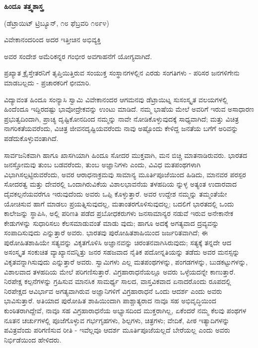 \begin{center}
\textbf{ಹಿಂದೂ ತತ್ತ್ವಶಾಸ್ತ್ರ}
\end{center}

\begin{center}
(ಡೆಟ್ರಾಯಿಟ್ ಟ್ರಿಬ್ಯೂನ್, ೧೮ ಫೆಬ್ರವರಿ ೧೮೯೪)
\end{center}

\begin{center}
ವಿವೇಕಾನಂದರಿಂದ ಅದರ ಇತ್ತೀಚಿನ ಅಭಿವ್ಯಕ್ತಿ
\end{center}

\begin{center}
ಅವರ ಸಂದೇಶ ಅಮೆರಿಕನ್ನರ ಗಂಭೀರ ಅವಗಾಹನೆಗೆ ಯೋಗ್ಯವಾಗಿದೆ.
\end{center}

ಪ್ರಖ್ಯಾತ ಕ್ರೈಸ್ತೇತರನಿಗೆ ತೃಪ್ತಿಯಿತ್ತಿರುವ ಸಂಯುಕ್ತ ಸಂಸ್ಥಾನಗಳಲ್ಲಿನ ಎರಡು ಸಂಗತಿಗಳು - ಪರಿಸರ ಜನಗಳಿಗೇನು ಮಾಡಬಲ್ಲದು - ಪ್ರಚಾರಕರಿಗೆ ಛೀಮಾರಿ.

ವಿದ್ಯಾವಂತ ಹಿಂದೂ ಸಂನ್ಯಾಸಿ ಸ್ವಾಮಿ ವಿವೇಕಾನಂದರ ಆಗಮನವು ಡೆಟ್ರಾಯಿಟ್ನ ಸುಸಂಸ್ಕೃತ ವಲಯಗಳಲ್ಲಿ ಹಿಂದೆಂದೂ ಇದ್ದಿರದಷ್ಟು ಭಾವೋದ್ರೇಕವನ್ನು ಉಂಟು ಮಾಡಿದೆ. ನಮ್ಮ ಭಾಷೆಯ ಮೇಲೆ ಅವರಿಗೆ ಇರುವ ಅಸಾಧಾರಣ ಪ್ರಭುತ್ವದಿಂದಾಗಿ, ಪ್ರಾಚ್ಯ ದೃಷ್ಟಿಕೋನದಿಂದ ನಮ್ಮನ್ನು ನಾವೇ ನೋಡಿಕೊಳ್ಳುವುದಕ್ಕೆ ಸಾಧ್ಯವಾಗಿದೆ; ಮತ್ತು ವಿಚಿತ್ರ ನಾಗರಿಕತೆಯವರೆಂದು, ವಿಚಿತ್ರ ಜೀವನದೃಷ್ಟಿಯವರೆಂದು ನಾವು ಅಷ್ಟೊಂದು ಕೇಳಿದ್ದ ಜನತೆಯ ಬಗೆಗೆ ಅರಿವನ್ನು ಪಡೆದುಕೊಳ್ಳುವಂತಾಗಿದೆ.

ಸಾರ್ವಜನಿಕವಾಗಿ ಹಾಗೂ ಖಾಸಗಿಯಾಗಿ ಹಿಂದೂ ಸೋದರ ಮುಕ್ತವಾಗಿ, ಮನ ಬಿಚ್ಚಿ ಮಾತನಾಡಿರುವರು. ಭಾರತದ ಜನಸ್ತೋಮವು ತುಂಬ ಬಡವರೆಂದು, ತುಂಬ ಅಜ್ಞಾನಿಗಳು ಎಂದು, ವಿವಿಧ ಮತಪಂಥಗಳಾಗಿ ವಿಭಾಗಿಸಲ್ಪಟ್ಟಿರುವರೆಂದು, ಅವರ ಆರಾಧನಾಕ್ರಮವು ಸಾಮಾನ್ಯ ಮೂರ್ತಿಪೂಜೆಯಿಂದ ಹಿಡಿದು, ಮಾನವರ ಪರಸ್ಪರ ಸೋದರತ್ವ ಮತ್ತು ದೇವರಲ್ಲಿ ಒಂದಾಗಿರುವಿಕೆಯ ವಿಶಾಲಭಾವನೆಯ ತಳಹದಿಯ ನ್ನುಳ್ಳ ಅತ್ಯಂತ ಉದಾರವಾದ ದೈವಕಲ್ಪನೆಯವರೆಗೂ ಇರುವುದೆಂದು ಅವರು ಒಪ್ಪಿ ಕೊಳ್ಳುತ್ತಾರೆ. ಅವರ ಉದ್ದೇಶ ನಮ್ಮನ್ನು ತಮ್ಮಂತೆಯೇ ಯೋಚಿಸುವ ಹಾಗೆ ಮಾಡಲು ಪ್ರಯತ್ನಿಸುವುದಲ್ಲ, ಮತಾಂತರಗೊಳಿಸುವುದಲ್ಲ; ಬದಲಿಗೆ ಭಾರತದಲ್ಲಿ ಒಂದು ಕಾಲೇಜನ್ನು ಸ್ಥಾಪಿಸಿ, ಅಲ್ಲಿ ಪರಿಣತಿ ಪಡೆದ ಪ್ರಬೋಧಕರುಗಳು ಜನಸಾಮಾನ್ಯರ ನಡುವೆ ಇರುವ ಅನೇಕಾನೇಕ ಕೇಡುಗಳನ್ನು ಸುಧಾರಿಸಲು ಕೆಲಸಮಾಡುವಂತೆ ಮಾಡು ವುದು; ಹಾಗೂ ಅದಕ್ಕೆ ಅಗತ್ಯವಾದ ದ್ರವ್ಯವನ್ನು ಸಂಪಾದಿಸುವುದು ಎನ್ನುತ್ತಾರೆ ಅವರು. ಭಾರತವು ಪುರೋಹಿತಶಾಹಿಯಿಂದ ಜರ್ಜರಿತವಾಗಿದೆ; ಈ ಪುರೋಹಿತಶಾಹಿಯೇ ಸತ್ಯವನ್ನು ವಿಕೃತಗೊಳಿಸಿ ಅಜ್ಞಾನವನ್ನು ಚಿರಂತನವಾಗಿಸಿರುವುದು; ಸತ್ಯಕ್ಕೆ ತನ್ನದೇ ಆದ ಅಸಂಸ್ಕೃತ ಸಂಕುಚಿತ ವ್ಯಾಖ್ಯಾನವನ್ನಿತ್ತು ಜನರ ಸಹಜವಾದ ನೈತಿಕ ಪದೋನ್ನತಿಯನ್ನು ತಡೆದು ಅವರ ಮನಸ್ಸನ್ನು ವಿಕೃತವನ್ನಾಗಿಸುವುದು ಎನ್ನುತ್ತಾರೆ ಅವರು. ಸ್ವಾಮಿಗಳು ಎಲ್ಲ ಮತಪಂಥಗಳನ್ನು, ಪಂಗಡಗಳನ್ನು, ಬುಡಕಟ್ಟುಗಳನ್ನು, ವಿಶಾಲವಾದ ತಳಹದಿಯ ಮೇಲೆ ಪರಿಗಣಿಸುತ್ತಾರೆ. ವಿಗ್ರಹಾರಾಧನೆಯಲ್ಲೂ ಅವರು ಒಳ್ಳೆಯದನ್ನೇ ಕಾಣುತ್ತಾರೆ. ನಿರಪೇಕ್ಷ ಕಲ್ಪನೆಗಳನ್ನು ಗ್ರಹಿಸುವ ಮಾನಸಿಕ ಸಾಮರ್ಥ್ಯ ಸಾಲದ, ವಾಸ್ತವಿಕವಾದ ಏನಾದರೊಂದು ರೂಪದಲ್ಲಿ ನಿರಪೇಕ್ಷದ ಆವಿರ್ಭಾವ ಅಗತ್ಯವಾಗಿರುವ ಅಜ್ಞಾನಿಗಳಿಗೆ ವಿಗ್ರಹಾರಾಧನೆ ಒಂದು ಆದರ್ಶ ಎಂದು ಅವರು ಭಾವಿಸುತ್ತಾರೆ. ಅತಿಯಾದ ಪುರೋಹಿತ ಶಾಹಿಯಿಂದಾಗಿ ಪಾಶ್ಚಾತ್ಯರಾದ ನಾವೂ ಸಹ ಅಭಿವೃದ್ಧಿಯಿಂದ ಕುಂಠಿತರಾಗಿದ್ದೇವೆ, ನಾವೂ ಸಹ ವಿಗ್ರಹಾರಾಧನೆಯ ಅಭ್ಯಾಸದಿಂದ ಮುಕ್ತರಾಗಿಲ್ಲ, ಏಕೆಂದರೆ ನಮ್ಮ ಕೆಲವು ಪಂಥಗಳ ನೂತನ ಚರ್ಚುಗಳಲ್ಲಿ ಪೂಜೆಗೊಳ್ಳುವ ಗರ್ಭಗೃಹಗಳು, ಶಿಲ್ಪಗಳು, ಚಿತ್ರಗಳು; ವೇದಿಕೆ, ಪೀಠ ಇತ್ಯಾದಿಗಳನ್ನು ಪವಿತ್ರವೆಂದು ಪರಿಗಣಿಸುವ ರೀತಿ - ಇವೆಲ್ಲವೂ ಆದರ್ಶ ಮೂರ್ತಿಪೂಜೆಯಲ್ಲದೆ ಬೇರೆಯಲ್ಲ ಎಂದು ಅವರು ನಿರ್ಭಿಡೆಯಿಂದ ಹೇಳಿದರು.

